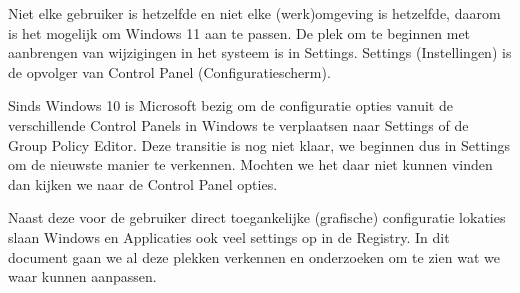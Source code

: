 Niet elke gebruiker is hetzelfde en niet elke (werk)omgeving is hetzelfde, daarom is het mogelijk om Windows 11 aan te passen. De plek om te beginnen met aanbrengen van wijzigingen in het systeem is in Settings. Settings (Instellingen) is de opvolger van Control Panel (Configuratiescherm).

Sinds Windows 10 is Microsoft bezig om de configuratie opties vanuit de verschillende Control Panels in Windows te verplaatsen naar Settings of de Group Policy Editor. Deze transitie is nog niet klaar, we beginnen dus in Settings om de nieuwste manier te verkennen. Mochten we het daar niet kunnen vinden dan kijken we naar de Control Panel opties.

Naast deze voor de gebruiker direct toegankelijke (grafische) configuratie lokaties slaan Windows en Applicaties ook veel settings op in de Registry. In dit document gaan we al deze plekken verkennen en onderzoeken om te zien wat we waar kunnen aanpassen.

